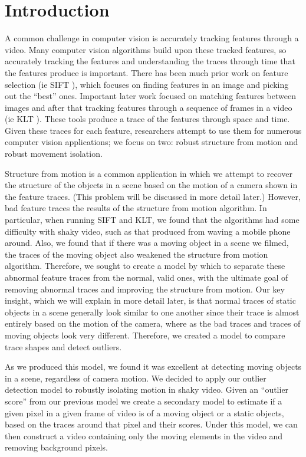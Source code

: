 \section{Introduction} %
\label{sec:Introduction}

A common challenge in computer vision is accurately tracking features through a
video.  Many computer vision algorithms build upon these tracked features, so
accurately tracking the features and understanding the traces through time that
the features produce is important.  There has been much prior work on feature
selection (ie SIFT \cite{sift}), which focuses on finding features in an image
and picking out the ``best'' ones.  Important later work focused on matching
features between images and after that tracking features through a sequence of
frames in a video (ie KLT \cite{klt}).  These tools produce a trace of the
features through space and time.
Given these traces for each feature, researchers attempt to use them for
numerous computer vision applications; we focus on two: robust structure from
motion and robust movement isolation.    

Structure from motion is a common application in which we attempt to recover
the structure of the objects in a scene based on the motion of a camera shown
in the feature traces.  (This problem will be discussed in more detail
later.)  However, bad feature traces  the results of the structure
from motion algorithm.
In particular, when running SIFT and KLT, we found that the algorithms had some
difficulty with shaky video, such as that produced from waving a mobile phone
around.  Also, we found that if there was a moving object in a scene we filmed,
the traces of the moving object also weakened the structure from motion
algorithm. 
Therefore, we sought to create a model by which to separate these abnormal
feature traces from the normal, valid ones, with the ultimate goal of removing
abnormal traces and improving the structure from motion.  Our key insight,
which we will explain in more detail later, is that normal traces of static
objects in a scene generally look similar to one another since their trace is
almost entirely based on the motion of the camera, where as the bad traces and
traces of moving objects look very different.  Therefore, we created a model to
compare trace shapes and detect outliers.

As we produced this model, we found it was excellent at detecting moving
objects in a scene, regardless of camera motion.  We decided to apply our
outlier detection model to robustly isolating motion in shaky video.  Given an
``outlier score'' from our previous model we create a secondary model to
estimate if a given pixel in a given frame of video is of a moving object or a
static objects, based on the traces around that pixel and their scores.  Under
this model, we can then construct a video containing only the moving elements
in the video and removing background pixels.

